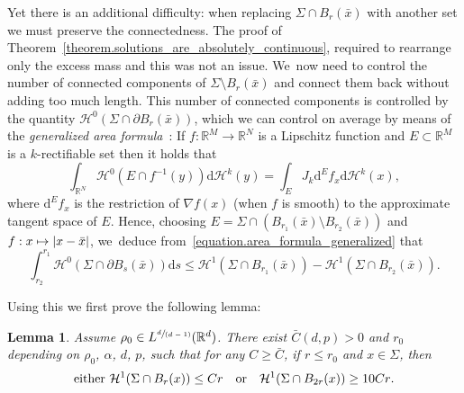 \documentclass[11pt]{article}
\numberwithin{equation}{section}
\newcommand\mto{\mathchoice{\longmapsto}{\mapsto}{\mapsto}{\mapsto}}
\newcommand{\spfrac}[2]{\sfrac{#1}{(#2)}}
\newtheorem{lemma}[theorem]{Lemma}
\theoremstyle{definition}
\newcommand\cH{\mathcal{H}}
\newcommand{\RR}{\mathbb{R}}
\newcommand\dd{\mathrm{d}}
\begin{document}
Yet there is an additional difficulty: when replacing $\Sigma \cap B_r(\bar x)$ with
another set we must preserve the connectedness.
The proof of Theorem~\ref{theorem.solutions_are_absolutely_continuous}, required to rearrange only the excess mass
and this was not an issue. We~now need to control the number of connected components
of $\Sigma \setminus B_r(\bar x)$ and connect them back without adding
too much length.
This number of connected components is controlled by the
quantity \hbox{$\cH^0(\Sigma\cap\partial B_r(\bar x))$}, which we can control on average
by means of the \emph{generalized area formula}~\cite[Th.\,2.91]{ambrosio2000functions}: If $f:\RR^M \to \RR^N$ is a Lipschitz function and $E\subset \RR^M$ is a $k$-rectifiable set then it holds that
\begin{equation}
\label{equation.area_formula_generalized}
\int_{\RR^N} \cH^0(E \cap f^{-1}(y))\dd\cH^k(y)
=
\int_{E} J_k\dd^Ef_x \dd\cH^k(x),
\end{equation}
where $\dd^Ef_x$ is the restriction of $\nabla f(x)$ (when $f$ is smooth) to the approximate tangent space of $E$.
Hence, choosing $E = \Sigma \cap (B_{r_1}(\bar x) \setminus B_{r_2}(\bar x))$ and $f : x \mto |x - \bar x|$, we~deduce from~\eqref{equation.area_formula_generalized} that
\begin{equation}\label{equation.area_formula_generalized_inequality}
\int_{r_2}^{r_1} \cH^0(\Sigma \cap \partial B_s(\bar x))\dd s
\le
\cH^1(\Sigma \cap B_{r_1}(\bar x)) - \cH^1(\Sigma \cap B_{r_2}(\bar x)).
\end{equation}

Using this we first prove the following lemma:
\begin{lemma}\label{lemma.ahlfors}
Assume $\rho_0\in L^{\spfrac{d}{d-1}}(\RR^d)$.
There exist $\bar C(d,p)>0$ and $r_0$ depending on $\rho_0$, $\alpha$, $d$, $p$, such
that for any $C\ge \bar C$, if $r\le r_0$ and $x\in \Sigma$,
then
\[
\text{either $\cH^1(\Sigma\cap B_r(x))\le Cr$\quad or\quad $\cH^1(\Sigma\cap B_{2r}(x))\ge 10Cr$.}
\]

\end{lemma}
\end{document}
